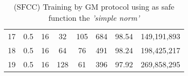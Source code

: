 \begin{table}[H]
\begin{tabular}{|c|c|c|c|c|c|c|c|}
        17                     & 0.5                   & 16                    & 32                    & 105                   & 684                   & 98.54                 & 149,191,893              \\
        18                     & 0.5                   & 16                    & 64                    & 76                    & 491                   & 98.24                 & 198,425,217              \\
        19                     & 0.5                   & 16                    & 128                   & 61                    & 396                   & 97.92                 & 269,858,295              \\
        \hline
    \end{tabular}
    \caption{(SFCC) Training by GM protocol using as safe function the \emph{'simple norm'}}
    \label{tab:table-gm-sf1-class-exp}
\end{table}

\newpage

